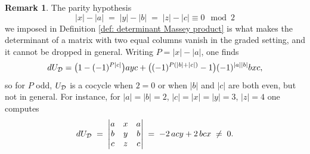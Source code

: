 \documentclass[11pt]{article}
\theoremstyle{definition}
\theoremstyle{definition}
\newtheorem{remark}[theorem]{Remark}
\begin{document}
\begin{remark}
\label{rmk: parity}
The parity hypothesis 
\begin{equation*} 
|x|-|a| \;=\; |y|-|b| \;=\; |z|-|c| \equiv 0 \mod 2 
\end{equation*} 
we imposed in Definition \ref{def: determinant Massey product} is what makes the 
determinant of a matrix with two equal columns vanish in the graded setting,
and it cannot be dropped in general. 
Writing $P=|x|-|a|$, one finds
\begin{equation*} 
dU_{\mathcal D}=\bigl(1-(-1)^{P|c|}\bigr)ayc
+\bigl((-1)^{P(|b|+|c|)}-1\bigr)(-1)^{|a||b|}bxc,
\end{equation*} 
so for $P$ odd, 
$U_{\mathcal D}$ is a cocycle when $2=0$ or 
when $|b|$ and $|c|$ are both even, but not in general. 
For instance, for
$|a|=|b|=2$, $|c|=|x|=|y|=3$, $|z|=4$ one computes
\begin{equation*}
dU_{\mathcal D} \;=\;
\begin{vmatrix}
a & x & a \\ b & y & b \\ c & z & c
\end{vmatrix}
\;=\; -2\,acy + 2\,bcx \;\neq\; 0.
\end{equation*}    
\end{remark}
\end{document}
